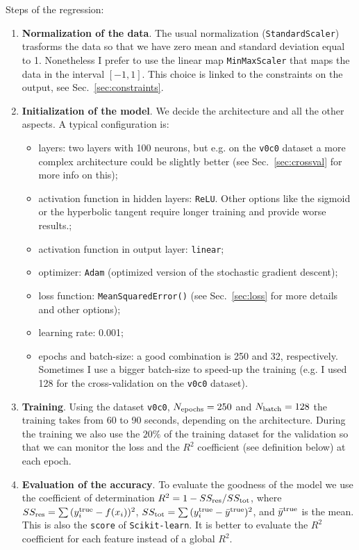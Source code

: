 \documentclass[prd,aps,twocolumn,a4paper,showkeys,nofootinbib]{revtex4-1}
\begin{document}
Steps of the regression:
\begin{enumerate}
\item \textbf{Normalization of the data}. The usual normalization (\texttt{StandardScaler})
trasforms the data so that we have zero mean and standard deviation equal to 1. 
Nonetheless I prefer to use the 
linear map \texttt{MinMaxScaler} that maps the data in the interval $[-1,1]$. 
This choice is linked to the constraints on the output, see Sec.~\ref{sec:constraints}. 

\item \textbf{Initialization of the model}. We decide the architecture and all the other aspects. 
A typical configuration is:
\begin{itemize}
\item layers: two layers with 100 neurons, but e.g. on the \texttt{v0c0}
dataset a more complex architecture could be slightly better 
(see Sec.~\ref{sec:crossval} for more info on this);
\item activation function in hidden layers: \texttt{ReLU}. Other options like the sigmoid 
or the hyperbolic tangent require longer training and provide worse results.;
\item activation function in output layer: \texttt{linear};
\item optimizer: \texttt{Adam} (optimized version of the stochastic gradient descent);
\item loss function: \texttt{MeanSquaredError()} (see Sec.~\ref{sec:loss} for more details 
and other options);
\item learning rate: 0.001;
\item epochs and batch-size: a good combination is 250 and 32, respectively. Sometimes I use a
bigger batch-size to speed-up the training (e.g. I used 128 for the cross-validation on
the \texttt{v0c0} dataset).
\end{itemize}

\item \textbf{Training}. Using  the dataset \texttt{v0c0}, $N_{\rm epochs}=250$ and 
$N_{\rm batch}=128$ the training
takes from 60 to 90 seconds, depending on the architecture. During the training we also 
use the $20\%$ of the training dataset for the validation so that
we can monitor the loss and the $R^2$ coefficient (see definition below) at each epoch.

\item \textbf{Evaluation of the accuracy}. To evaluate the goodness of the model 
we use the coefficient of determination $R^2=1-SS_{\rm res}/SS_{\rm tot}$, where
$SS_{\rm res}=\sum{(y^{\rm true}_i-f(x_i))^2}$, 
$SS_{\rm tot}=\sum{(y^{\rm true}_i - \bar{y}^{\rm true})^2}$, 
and $\bar{y}^{\rm true}$ is the mean. This is also the \texttt{score} 
of \texttt{Scikit-learn}. It is better to evaluate the $R^2$ coefficient
for each feature instead of a global $R^2$. 
\end{enumerate}
\end{document}
